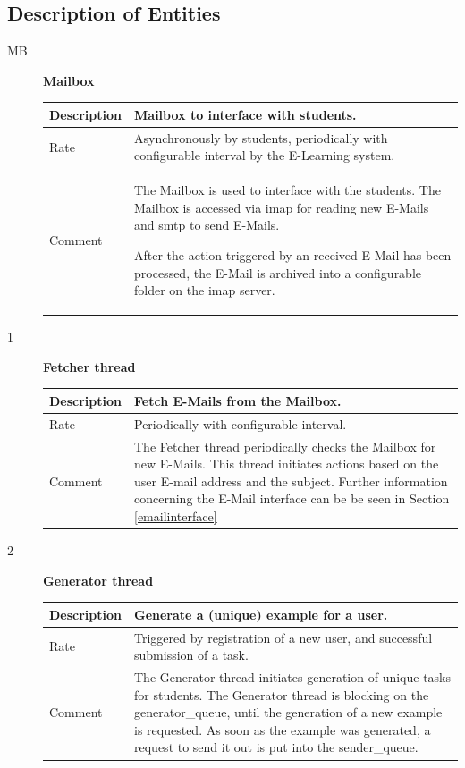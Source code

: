 \subsection{Description of Entities} \label{autosub_entities}
\begin{description}
    \item [MB] \textbf{Mailbox} \\
    \begin{tabular}{|p{2cm}|p{11cm}|}
        \hline
        Description & Mailbox to interface with students. \\
        \hline
        Rate & Asynchronously by students, periodically with configurable interval by
		the E-Learning system. \\
        \hline

        Comment & The Mailbox is used to interface with the students.
        The Mailbox is accessed via \gls{imap} for reading new E-Mails and \gls{smtp} 
		to send E-Mails.

        After the action triggered by an received E-Mail has been processed, the E-Mail 
		is archived into a configurable folder on the \gls{imap} server.
        \\
        \hline
    \end{tabular}
    \item [1] \textbf{Fetcher thread} \\
    \begin{tabular}{|p{2cm}|p{11cm}|}
        \hline
        Description &  Fetch E-Mails from the Mailbox.\\
        \hline
        Rate & Periodically with configurable interval. \\
        \hline
        Comment & The Fetcher thread periodically checks the Mailbox for new E-Mails. 
		This thread initiates actions based on the user E-mail address and the subject.
		Further information concerning the E-Mail interface can be be seen in Section 
		\ref{emailinterface} 
        \\
        \hline
    \end{tabular}

	\item [2] \textbf{Generator thread} \\
    \begin{tabular}{|p{2cm}|p{11cm}|}
        \hline
        Description & Generate a (unique) example for a user. \\
        \hline
        Rate & Triggered by registration of a new user, and successful submission 
		of a task.  \\
        \hline
        Comment & The Generator thread initiates generation of unique tasks for students.
  		The Generator thread is blocking on the generator\_queue, until the generation 
		of a new example is requested. As soon as the example was generated, a request 
		to send it out is put into the sender\_queue.
        \\
        \hline
    \end{tabular}
   

\end{description}
